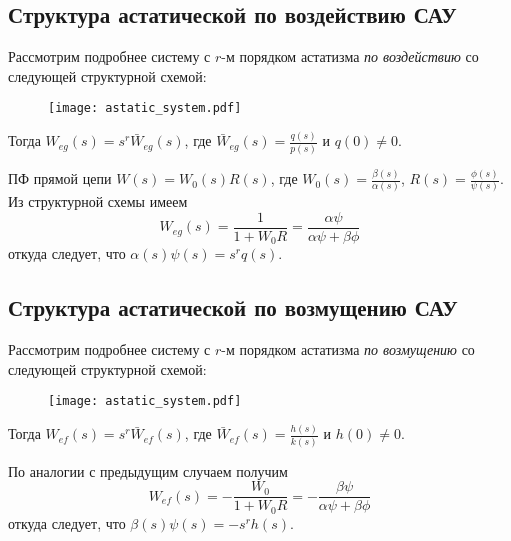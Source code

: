 \documentclass[../../TAU.tex]{subfiles}
\begin{document}
\subsection{Структура астатической по воздействию САУ }

    Рассмотрим подробнее систему с $r$-м порядком астатизма {\it по воздействию} со следующей структурной схемой:
    \begin{figure}[h]
        \centering
        \texttt{[image: astatic\_system.pdf]}
    \end{figure}

    Тогда $W_{eg}(s) = s^r\bar W_{eg}(s)$, где $\bar W_{eg}(s) = \frac{q(s)}{p(s)}$ и $q(0)\neq 0$.

    ПФ прямой цепи $W(s) = W_0(s)R(s)$, где $W_0(s) = \frac{\beta(s)}{\alpha(s)}$, $R(s) = \frac{\phi(s)}{\psi(s)}$. Из структурной схемы имеем
    $$
        W_{eg}(s) = \frac{1}{1+W_0R} = \frac{\alpha\psi}{\alpha\psi+\beta\phi}
    $$
    откуда следует, что $\alpha(s)\psi(s) = s^r q(s)$.

\subsection{Структура астатической по возмущению САУ }

    Рассмотрим подробнее систему с $r$-м порядком астатизма {\it по возмущению} со следующей структурной схемой:
    \begin{figure}[h]
        \centering
        \texttt{[image: astatic\_system.pdf]}
    \end{figure}

    Тогда $W_{ef}(s) = s^r\bar W_{ef}(s)$, где $\bar W_{ef}(s) = \frac{h(s)}{k(s)}$ и $h(0)\neq 0$.

    По аналогии с предыдущим случаем получим
    $$
        W_{ef}(s) = -\frac{W_0}{1+W_0R} = -\frac{\beta\psi}{\alpha\psi+\beta\phi}
    $$
    откуда следует, что $\beta(s)\psi(s) = -s^r h(s)$.

\end{document}
